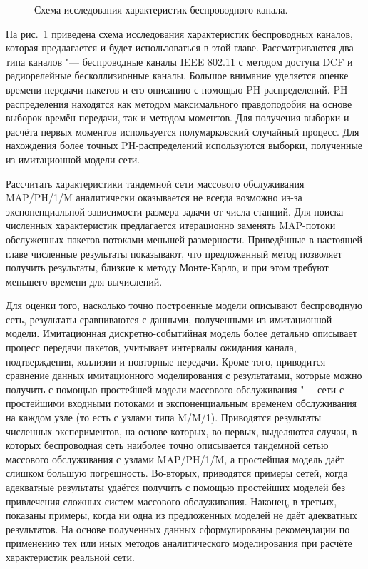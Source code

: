 \begin{figure}[h]
  \caption{Схема исследования характеристик беспроводного канала.}
  \label{fig:ch4_research_schema}
\end{figure}

На рис.~\ref{fig:ch4_research_schema} приведена схема исследования характеристик беспроводных каналов, которая предлагается и будет использоваться в этой главе. Рассматриваются два типа каналов "--- беспроводные каналы IEEE 802.11 с методом доступа DCF и радиорелейные бесколлизионные каналы. Большое внимание уделяется оценке времени передачи пакетов и его описанию с помощью PH-распределений. PH-распределения находятся как методом максимального правдоподобия на основе выборок времён передачи, так и методом моментов. Для получения выборки и расчёта первых моментов используется полумарковский случайный процесс. Для нахождения более точных PH-распределений используются выборки, полученные из имитационной модели сети. 

Рассчитать характеристики тандемной сети массового обслуживания MAP/PH/1/M аналитически оказывается не всегда возможно из-за экспоненциальной зависимости размера задачи от числа станций. Для поиска численных характеристик предлагается итерационно заменять MAP-потоки обслуженных пакетов потоками меньшей размерности. Приведённые в настоящей главе численные результаты показывают, что предложенный метод позволяет получить результаты, близкие к методу Монте-Карло, и при этом требуют меньшего времени для вычислений.

Для оценки того, насколько точно построенные модели описывают беспроводную сеть, результаты сравниваются с данными, полученными из имитационной модели. Имитационная дискретно-событийная модель более детально описывает процесс передачи пакетов, учитывает интервалы ожидания канала, подтверждения, коллизии и повторные передачи. Кроме того, приводится сравнение данных имитационного моделирования с результатами, которые можно получить с помощью простейшей модели массового обслуживания "--- сети с простейшими входными потоками и экспоненциальным временем обслуживания на каждом узле (то есть с узлами типа M/M/1). Приводятся результаты численных экспериментов, на основе которых, во-первых, выделяются случаи, в которых беспроводная сеть наиболее точно описывается тандемной сетью массового обслуживания с узлами MAP/PH/1/M, а простейшая модель даёт слишком большую погрешность. Во-вторых, приводятся примеры сетей, когда адекватные результаты удаётся получить с помощью простейших моделей без привлечения сложных систем массового обслуживания. Наконец, в-третьих, показаны примеры, когда ни одна из предложенных моделей не даёт адекватных результатов. На основе полученных данных сформулированы рекомендации по применению тех или иных методов аналитического моделирования при расчёте характеристик реальной сети.

